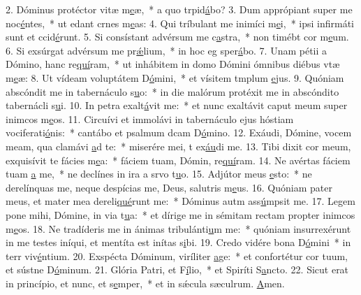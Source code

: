 2. Dóminus protéctor vitæ m\uline{e}æ,~* a quo trpid\uline{á}bo?
3. Dum apprópiant super me noc\uline{é}ntes,~* ut edant crnes m\uline{e}as:
4. Qui tríbulant me inimíci m\uline{e}i,~* ipsi infirmáti sunt et ccid\uline{é}runt.
5. Si consístant advérsum me c\uline{a}stra,~* non timébt cor m\uline{e}um.
6. Si exsúrgat advérsum me pr\uline{ǽ}lium,~* in hoc eg sper\uline{á}bo.
7. Unam pétii a Dómino, hanc re\uline{quí}ram,~* ut inhábitem in domo Dómini ómnibus diébus vtæ m\uline{e}æ:
8. Ut vídeam voluptátem D\uline{ó}mini,~* et vísitem tmplum \uline{e}jus.
9. Quóniam abscóndit me in tabernáculo s\uline{u}o:~* in die malórum protéxit me in abscóndito tabernácli s\uline{u}i.
10. In petra exalt\uline{á}vit me:~* et nunc exaltávit caput meum super inimcos m\uline{e}os.
11. Circuívi et immolávi in tabernáculo ejus hóstiam vociferati\uline{ó}nis:~* cantábo et psalmum dcam D\uline{ó}mino.
12. Exáudi, Dómine, vocem meam, qua clamávi \uline{a}d te:~* miserére mei, t ex\uline{áu}di me.
13. Tibi dixit cor meum, exquisívit te fácies m\uline{e}a:~* fáciem tuam, Dómin, re\uline{quí}ram.
14. Ne avértas fáciem tuam \uline{a} me,~* ne declínes in ira a srvo t\uline{u}o.
15. Adjútor meus \uline{e}sto:~* ne derelínquas me, neque despícias me, Deus, salutris m\uline{e}us.
16. Quóniam pater meus, et mater mea dereli\uline{qué}runt me:~* Dóminus autm ass\uline{ú}mpsit me.
17. Legem pone mihi, Dómine, in via t\uline{u}a:~* et dírige me in sémitam rectam propter inimcos m\uline{e}os.
18. Ne tradíderis me in ánimas tribulánti\uline{u}m me:~* quóniam insurrexérunt in me testes iníqui, et mentíta est inítas s\uline{i}bi.
19. Credo vidére bona D\uline{ó}mini~* in terr viv\uline{é}ntium.
20. Exspécta Dóminum, viríliter \uline{a}ge:~* et confortétur cor tuum, et sústne D\uline{ó}minum.
21. Glória Patri, et F\uline{í}lio,~* et Spiríti S\uline{a}ncto.
22. Sicut erat in princípio, et nunc, et s\uline{e}mper,~* et in sǽcula sæculrum. \uline{A}men.
